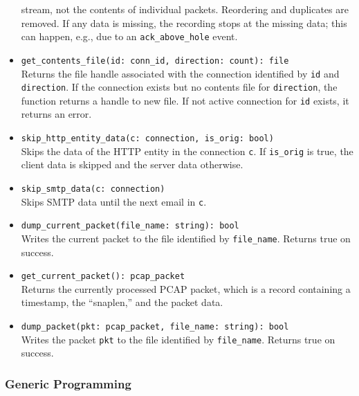 \documentclass[10pt,landscape]{article}
\newcommand{\ReturnsTrueOnSuccess}{Returns true on success.\xspace}
\begin{document}
\begin{multicols*}{2}
\begin{itemize}
    stream, not the contents of individual packets. Reordering and duplicates
    are removed. If any data is missing, the recording stops at the missing
    data; this can happen, e.g., due to an \verb|ack_above_hole| event.
  \item \verb|get_contents_file(id: conn_id, direction: count): file|\\
    Returns the file handle associated with the connection identified by
    \texttt{id} and \texttt{direction}. If the connection exists but no
    contents file for \texttt{direction}, the function returns a handle to new
    file. If not active connection for \texttt{id} exists, it returns an error.
  \item \verb|skip_http_entity_data(c: connection, is_orig: bool)|\\
    Skips the data of the HTTP entity in the connection \texttt{c}. If
    \verb|is_orig| is true, the client data is skipped and the server data
    otherwise.
  \item \verb|skip_smtp_data(c: connection)|\\
    Skips SMTP data until the next email in \texttt{c}.
  \item \verb|dump_current_packet(file_name: string): bool|\\
    Writes the current packet to the file identified by \verb|file_name|.
    \ReturnsTrueOnSuccess
  \item \verb|get_current_packet(): pcap_packet|\\
    Returns the currently processed PCAP packet, which is a record containing a
    timestamp, the ``snaplen,'' and the packet data.
  \item \verb|dump_packet(pkt: pcap_packet, file_name: string): bool|\\
    Writes the packet \verb|pkt| to the file identified by \verb|file_name|.
    \ReturnsTrueOnSuccess
\end{itemize}

\subsubsection*{Generic Programming}


\end{multicols*}
\end{document}
